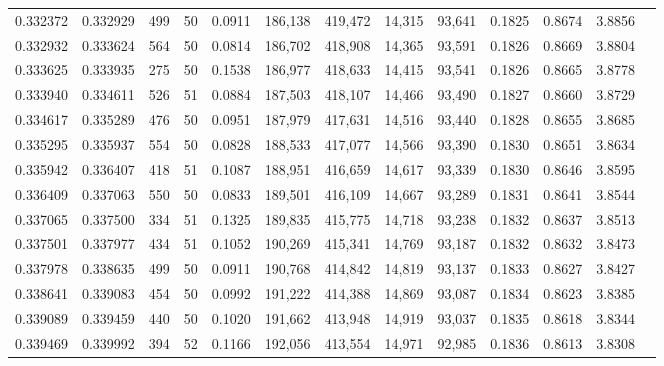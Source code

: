\begin{tabular}{rrrrrrrrrrrrr}
0.332372 & 0.332929 &   499 &  50 &                                     0.0911 & 186,138 & 419,472 &  14,315 &  93,641 & 0.1825 & 0.8674 & 3.8856 \\
0.332932 & 0.333624 &   564 &  50 &                                     0.0814 & 186,702 & 418,908 &  14,365 &  93,591 & 0.1826 & 0.8669 & 3.8804 \\
0.333625 & 0.333935 &   275 &  50 &                                     0.1538 & 186,977 & 418,633 &  14,415 &  93,541 & 0.1826 & 0.8665 & 3.8778 \\
0.333940 & 0.334611 &   526 &  51 &                                     0.0884 & 187,503 & 418,107 &  14,466 &  93,490 & 0.1827 & 0.8660 & 3.8729 \\
0.334617 & 0.335289 &   476 &  50 &                                     0.0951 & 187,979 & 417,631 &  14,516 &  93,440 & 0.1828 & 0.8655 & 3.8685 \\
0.335295 & 0.335937 &   554 &  50 &                                     0.0828 & 188,533 & 417,077 &  14,566 &  93,390 & 0.1830 & 0.8651 & 3.8634 \\
0.335942 & 0.336407 &   418 &  51 &                                     0.1087 & 188,951 & 416,659 &  14,617 &  93,339 & 0.1830 & 0.8646 & 3.8595 \\
0.336409 & 0.337063 &   550 &  50 &                                     0.0833 & 189,501 & 416,109 &  14,667 &  93,289 & 0.1831 & 0.8641 & 3.8544 \\
0.337065 & 0.337500 &   334 &  51 &                                     0.1325 & 189,835 & 415,775 &  14,718 &  93,238 & 0.1832 & 0.8637 & 3.8513 \\
0.337501 & 0.337977 &   434 &  51 &                                     0.1052 & 190,269 & 415,341 &  14,769 &  93,187 & 0.1832 & 0.8632 & 3.8473 \\
0.337978 & 0.338635 &   499 &  50 &                                     0.0911 & 190,768 & 414,842 &  14,819 &  93,137 & 0.1833 & 0.8627 & 3.8427 \\
0.338641 & 0.339083 &   454 &  50 &                                     0.0992 & 191,222 & 414,388 &  14,869 &  93,087 & 0.1834 & 0.8623 & 3.8385 \\
0.339089 & 0.339459 &   440 &  50 &                                     0.1020 & 191,662 & 413,948 &  14,919 &  93,037 & 0.1835 & 0.8618 & 3.8344 \\
0.339469 & 0.339992 &   394 &  52 &                                     0.1166 & 192,056 & 413,554 &  14,971 &  92,985 & 0.1836 & 0.8613 & 3.8308 \\

\end{tabular}
